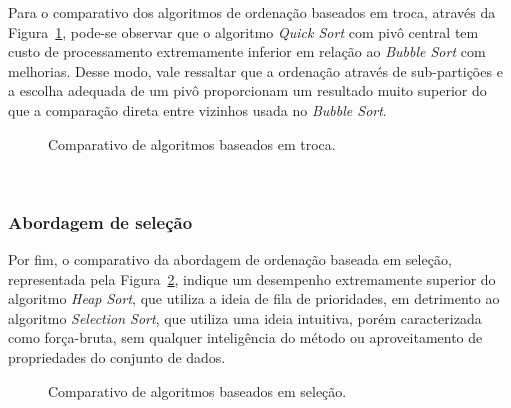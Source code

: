 \documentclass[conference,onecolumn]{IEEEtran}
\begin{document}
Para o comparativo dos algoritmos de ordenação baseados em troca, através da Figura~\ref{image: graph-troca}, pode-se observar que o algoritmo \textit{Quick Sort} com pivô central tem custo de processamento extremamente inferior em relação ao \textit{Bubble Sort} com melhorias. Desse modo, vale ressaltar que a ordenação através de sub-partições e a escolha adequada de um pivô proporcionam um resultado muito superior do que a comparação direta entre vizinhos usada no \textit{Bubble Sort}.
\begin{figure}[H]

\centering
{}
\caption{Comparativo de algoritmos baseados em troca.}
\label{image: graph-troca}
\end{figure}

~\\
\subsubsection{Abordagem de seleção}
Por fim, o comparativo da abordagem de ordenação baseada em seleção, representada pela Figura~\ref{image: graph-selecao}, indique um desempenho extremamente superior do algoritmo \textit{Heap Sort}, que utiliza a ideia de fila de prioridades, em detrimento ao algoritmo \textit{Selection Sort}, que utiliza uma ideia intuitiva, porém caracterizada como força-bruta, sem qualquer inteligência do método ou aproveitamento de propriedades do conjunto de dados.

\begin{figure}[H]

\centering
{}
\caption{Comparativo de algoritmos baseados em seleção.}
\label{image: graph-selecao}
\end{figure}
\end{document}

